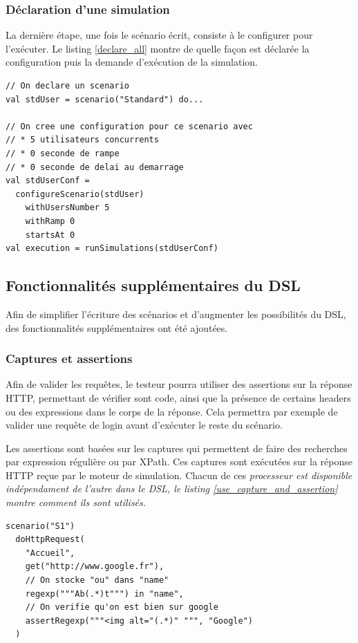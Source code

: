 \subsubsection{Déclaration d'une simulation}

La dernière étape, une fois le scénario écrit, consiste à le configurer pour l'exécuter. Le listing \ref{declare_all} montre de quelle façon est déclarée la configuration puis la demande d'exécution de la simulation.

\begin{lstlisting}[caption={Déclaration d'une simulation au complet},label={declare_all}]
// On declare un scenario
val stdUser = scenario("Standard") do...

// On cree une configuration pour ce scenario avec
// * 5 utilisateurs concurrents
// * 0 seconde de rampe
// * 0 seconde de delai au demarrage
val stdUserConf = 
  configureScenario(stdUser)
    withUsersNumber 5 
    withRamp 0
    startsAt 0
val execution = runSimulations(stdUserConf)
\end{lstlisting}

\subsection{Fonctionnalités supplémentaires du DSL}
Afin de simplifier l'écriture des scénarios et d'augmenter les possibilités du DSL, des fonctionnalités supplémentaires ont été ajoutées.

\subsubsection{Captures et assertions}
Afin de valider les requêtes, le testeur pourra utiliser des assertions sur la réponse HTTP, permettant de vérifier sont code, ainsi que la présence de certains headers ou des expressions dans le corps de la réponse. Cela permettra par exemple de valider une requête de login avant d'exécuter le reste du scénario. 

Les assertions sont basées sur les captures qui permettent de faire des recherches par expression régulière ou par XPath. Ces captures sont exécutées sur la réponse HTTP reçue par le moteur de simulation. Chacun de ces \em{processeur} est disponible indépendament de l'autre dans le DSL, le listing \ref{use_capture_and_assertion} montre comment ils sont utilisés.

\begin{lstlisting}[caption={Utilisation des captures et assertions},label={use_capture_and_assertion}]
scenario("S1")
  doHttpRequest(
    "Accueil",
    get("http://www.google.fr"),
    // On stocke "ou" dans "name"
    regexp("""Ab(.*)t""") in "name",
    // On verifie qu'on est bien sur google
    assertRegexp("""<img alt="(.*)" """, "Google")
  )
\end{lstlisting}

